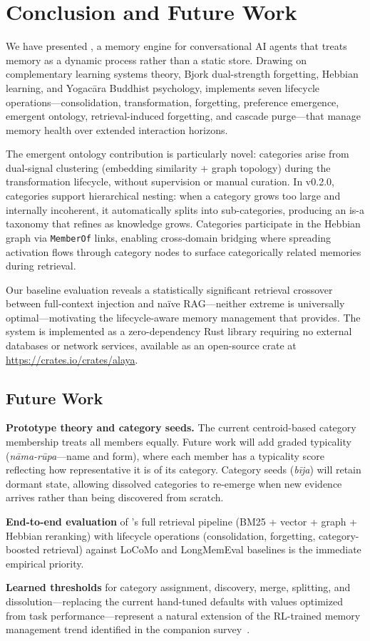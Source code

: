 \section{Conclusion and Future Work}
\label{sec:conclusion}

We have presented \alaya{}, a memory engine for conversational AI agents
that treats memory as a dynamic process rather than a static store. Drawing
on complementary learning systems theory, Bjork dual-strength forgetting,
Hebbian learning, and Yogac\=ara Buddhist psychology, \alaya{} implements
seven lifecycle operations---consolidation, transformation, forgetting,
preference emergence, emergent ontology, retrieval-induced forgetting, and
cascade purge---that manage memory health over extended interaction
horizons.

The emergent ontology contribution is particularly novel: categories arise
from dual-signal clustering (embedding similarity + graph topology) during
the transformation lifecycle, without supervision or manual curation.
In v0.2.0, categories support hierarchical nesting: when a category grows
too large and internally incoherent, it automatically splits into
sub-categories, producing an is-a taxonomy that refines as knowledge
grows. Categories participate in the Hebbian graph via \texttt{MemberOf}
links, enabling cross-domain bridging where spreading activation flows
through category nodes to surface categorically related memories during
retrieval.

Our baseline evaluation reveals a statistically significant retrieval
crossover between full-context injection and na\"ive RAG---neither extreme
is universally optimal---motivating the lifecycle-aware memory management
that \alaya{} provides. The system is implemented as a zero-dependency Rust
library requiring no external databases or network services, available as
an open-source crate at \url{https://crates.io/crates/alaya}.

\subsection*{Future Work}

\textbf{Prototype theory and category seeds.} The current centroid-based
category membership treats all members equally. Future work will add
graded typicality (\emph{n\=ama-r\=upa}---name and form), where each
member has a typicality score reflecting how representative it is of its
category. Category seeds (\emph{b\=ija}) will retain dormant state,
allowing dissolved categories to re-emerge when new evidence arrives
rather than being discovered from scratch.

\textbf{End-to-end evaluation} of \alaya{}'s full retrieval pipeline
(BM25 + vector + graph + Hebbian reranking) with lifecycle operations
(consolidation, forgetting, category-boosted retrieval) against LoCoMo
and LongMemEval baselines is the immediate empirical priority.

\textbf{Learned thresholds} for category assignment, discovery, merge,
splitting, and dissolution---replacing the current hand-tuned defaults
with values optimized from task performance---represent a natural
extension of the RL-trained memory management trend identified in the
companion survey~\cite{hui2026taxonomy}.
